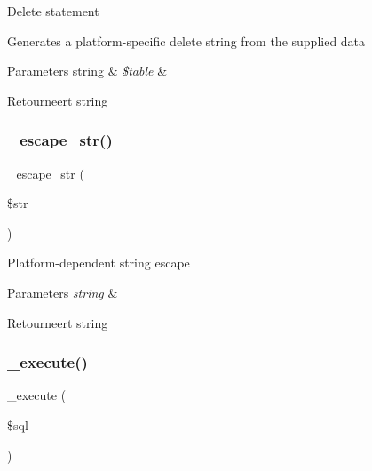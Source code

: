 Delete statement

Generates a platform-\/specific delete string from the supplied data


\begin{DoxyParams}[1]{Parameters}
string & {\em \$table} & \\
\hline
\end{DoxyParams}
\begin{DoxyReturn}{Retourneert}
string 
\end{DoxyReturn}
\mbox{\label{class_c_i___d_b__postgre__driver_af8ef0237bfcdb19215b63fff769e7a55}} 
\subsubsection{\texorpdfstring{\_escape\_str()}{\_escape\_str()}}
{\footnotesize\ttfamily \+\_\+escape\+\_\+str (\begin{DoxyParamCaption}\item[{}]{\$str }\end{DoxyParamCaption})\hspace{0.3cm}{\ttfamily [protected]}}

Platform-\/dependent string escape


\begin{DoxyParams}{Parameters}
{\em string} & \\
\hline
\end{DoxyParams}
\begin{DoxyReturn}{Retourneert}
string 
\end{DoxyReturn}
\mbox{\label{class_c_i___d_b__postgre__driver_a114ab675d89bf8324a41785fb475e86d}} 
\subsubsection{\texorpdfstring{\_execute()}{\_execute()}}
{\footnotesize\ttfamily \+\_\+execute (\begin{DoxyParamCaption}\item[{}]{\$sql }\end{DoxyParamCaption})\hspace{0.3cm}{\ttfamily [protected]}}

